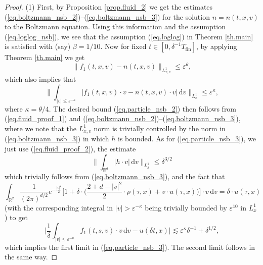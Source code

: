 \documentclass[10pt, reqno]{amsart}
\newcommand{\Rb}{\mathbb R}
\theoremstyle{definition}
\theoremstyle{remark}
\numberwithin{equation}{section}
\begin{document}
\begin{proof} (1) First, by Proposition \ref{prop.fluid_2} we get the estimates (\ref{eq.boltzmann_nsb_2})--(\ref{eq.boltzmann_nsb_3}) for the solution $n=n(t,x,v)$ to the Boltzmann equation. Using this information and the assumption (\ref{eq.loglog_nsb}), we see that the assumption (\ref{eq.loglog}) in Theorem \ref{th.main} is satisfied with (say) $\beta=1/10$. Now for fixed $t\in[0,{\delta^{-1}T_{\mathrm{fin}}}]$, by applying Theorem \ref{th.main} we get
\begin{equation}\label{eq.fluid_proof_1}\|f_1(t,x,v)-n(t,x,v)\|_{L_{x,v}^1}\leq \varepsilon^{\theta},
\end{equation}which also implies that
\begin{equation}\label{eq.fluid_proof_2}\bigg\|\int_{|v|\leq\varepsilon^{-\kappa}}|f_1(t,x,v)\cdot v-n(t,x,v)\cdot v|\,\mathrm{d}v\bigg\|_{L_x^1}\leq \varepsilon^{\kappa},
\end{equation} where $\kappa=\theta/4$. The desired bound (\ref{eq.particle_nsb_2}) then follows from (\ref{eq.fluid_proof_1}) and (\ref{eq.boltzmann_nsb_2})--(\ref{eq.boltzmann_nsb_3}), where we note that the $L_{x,v}^1$ norm is trivially controlled by the norm in (\ref{eq.boltzmann_nsb_3}) in which $h$ is bounded. As for (\ref{eq.particle_nsb_3}), we just use (\ref{eq.fluid_proof_2}), the estimate
\begin{equation}\label{eq.fluid_proof_3}\bigg\|\int_{\Rb^d}|h\cdot v|\,\mathrm{d}v\bigg\|_{L_x^1}\leq \delta^{3/2}
\end{equation} which trivially follows from (\ref{eq.boltzmann_nsb_3}), and the fact that
\begin{equation}\label{eq.fluid_proof_4}
\int_{\Rb^d}\frac{1}{(2\pi)^{d/2}}e^{-\frac{|v|^2}{2}}\bigg[1+\delta\cdot\bigg(\frac{2+d-|v|^2}{2}\cdot\rho({\tau},x)+v\cdot u({\tau},x)\bigg)\bigg]\cdot v\,\mathrm{d}v=\delta\cdot u({\tau},x)
\end{equation} (with the corresponding integral in $|v|>\varepsilon^{-\kappa}$ being trivially bounded by $\varepsilon^{10}$ in $L_x^1$) to get
\begin{equation}\label{eq.fluid_proof_5}
\bigg|\frac{1}{\delta}\int_{|v|\leq \varepsilon^{-\kappa}}f_1(t,s,v)\cdot v\,\mathrm{d}v-u({\delta t},x)\bigg|\lesssim \varepsilon^{\kappa}\delta^{-1}+\delta^{1/2},
\end{equation} which implies the first limit in (\ref{eq.particle_nsb_3}). The second limit follows in the same way.


\end{proof}
\end{document}

